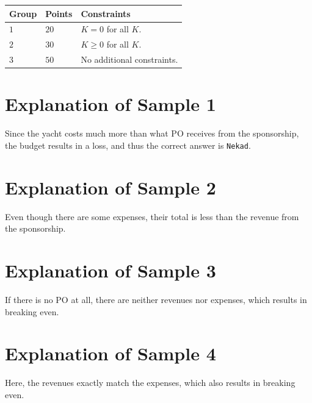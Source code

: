 \noindent
\begin{tabular}{| l | l | p{12cm} |}
  \hline
  \textbf{Group} & \textbf{Points} & \textbf{Constraints} \\ \hline
  $1$    & $20$       & $K = 0$ for all $K$. \\ \hline 
  $2$    & $30$       & $K \geq 0$ for all $K$. \\ \hline
  $3$    & $50$       & No additional constraints. \\ \hline
\end{tabular}

\section*{Explanation of Sample 1}  
Since the yacht costs much more than what PO receives from the sponsorship, the budget results in a loss, and thus the
correct answer is \texttt{Nekad}.  

\section*{Explanation of Sample 2}  
Even though there are some expenses, their total is less than the revenue from the sponsorship.  

\section*{Explanation of Sample 3}  
If there is no PO at all, there are neither revenues nor expenses, which results in breaking even.  

\section*{Explanation of Sample 4}  
Here, the revenues exactly match the expenses, which also results in breaking even. 
